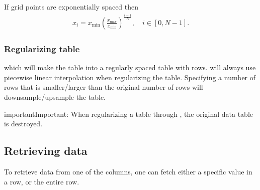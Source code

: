 \documentclass[letterpaper,10pt,english]{sphinxmanual}
\begin{document}
\sphinxAtStartPar
{}

\sphinxAtStartPar
If grid points are exponentially spaced then
\begin{equation*}
\begin{split}x_i = x_{\textrm{min}}\left(\frac{x_{\textrm{max}}}{x_{\textrm{min}}}\right)^{\frac{i-1}{N}}, \quad i\in[0,N-1].\end{split}
\end{equation*}

\subsubsection{Regularizing table}
\label{\detokenize{Utilities/LookupTable:regularizing-table}}
\begin{sphinxVerbatim}[commandchars=\\\{\},formatcom=\scriptsize]
   
\end{sphinxVerbatim}

\sphinxAtStartPar
which will make the table into a regularly spaced table with  rows.
 will always use piecewise linear interpolation when regularizing the table.
Specifying a number of rows that is smaller/larger than the original number of rows will downsample/upsample the table.

\begin{sphinxadmonition}{important}{Important:}
\sphinxAtStartPar
When regularizing a table through , the original data table is destroyed.
\end{sphinxadmonition}


\subsection{Retrieving data}
\label{\detokenize{Utilities/LookupTable:retrieving-data}}
\sphinxAtStartPar
To retrieve data from one of the columns, one can fetch either a specific value in a row, or the entire row.

\begin{sphinxVerbatim}[commandchars=\\\{\},formatcom=\scriptsize]
 
   

    
\end{sphinxVerbatim}
\end{document}
